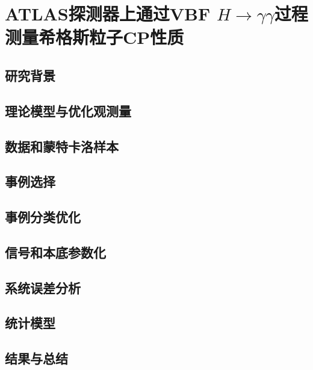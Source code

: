 \chapter{ATLAS探测器上通过VBF $H \to \gamma\gamma$过程测量希格斯粒子CP性质}
\label{chap:vbfcp}

\section{研究背景}
\section{理论模型与优化观测量}
\section{数据和蒙特卡洛样本}
\section{事例选择}
\section{事例分类优化}
\section{信号和本底参数化}
\section{系统误差分析}
\section{统计模型}
\section{结果与总结}



